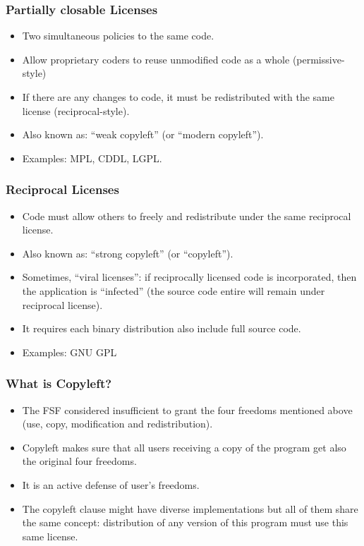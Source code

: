 
\begin{frame}
\frametitle{Partially closable Licenses}

\begin{itemize}
\item Two simultaneous policies to the same code.
\item Allow proprietary coders to reuse unmodified code as a whole (permissive-style)
\item If there are any changes to code, it must be redistributed with the same license (reciprocal-style).
\item Also known as: ``weak copyleft'' (or ``modern copyleft''). 
\item Examples: MPL, CDDL, LGPL.
\end{itemize}

\end{frame}


\begin{frame}
\frametitle{Reciprocal Licenses}

\begin{itemize}
\item Code must allow others to freely and redistribute under the same reciprocal license.
\item Also known as: ``strong copyleft'' (or ``copyleft''). 
\item Sometimes, ``viral licenses'': if reciprocally licensed code is incorporated, then the application is ``infected'' (the source code entire will remain under reciprocal license).  
\item It requires each binary distribution also include full source code.
\item Examples: GNU GPL
\end{itemize}

\end{frame}

\begin{frame}
\frametitle{What is Copyleft?}
\begin{itemize}
    \item The FSF considered insufficient to grant the four freedoms mentioned above (use, copy, modification and redistribution).         
    \item Copyleft makes sure that all users receiving a copy of the program get also the original four freedoms.
    \item It is an active defense of user's freedoms. 
    \item The \alert{copyleft clause} might have diverse implementations but all of them share the same concept: \alert{distribution of any version of this program must use this same license.}

\end{itemize}

\end{frame}


